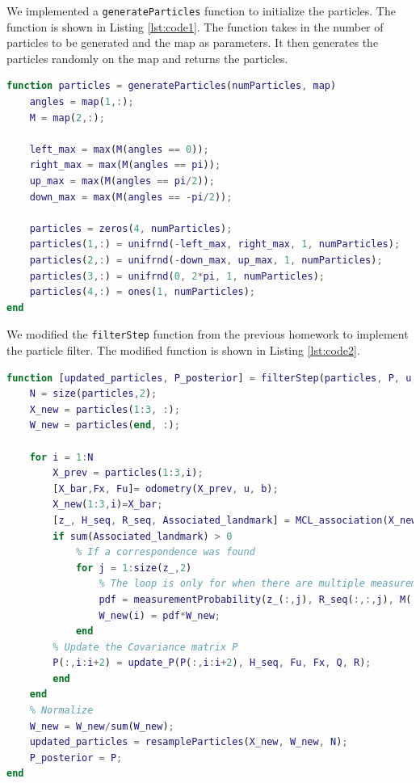 \documentclass[answers]{exam}
\begin{document}
\begin{questions}
\begin{parts}
\begin{solution}
            We implemented a \texttt{generateParticles} function to initialize the
            particles. The function is shown in Listing \ref{lst:code1}. The function takes
            in the number of particles to be generated and the map as parameters. It then
            generates the particles randomly on the map and returns the particles.

            \begin{lstlisting}[language=Matlab, caption=Generate Particles, label={lst:code1}]
function particles = generateParticles(numParticles, map)
    angles = map(1,:);
    M = map(2,:);

    left_max = max(M(angles == 0));
    right_max = max(M(angles == pi));
    up_max = max(M(angles == pi/2));
    down_max = max(M(angles == -pi/2));

    particles = zeros(4, numParticles);
    particles(1,:) = unifrnd(-left_max, right_max, 1, numParticles);
    particles(2,:) = unifrnd(-down_max, up_max, 1, numParticles);
    particles(3,:) = unifrnd(0, 2*pi, 1, numParticles);
    particles(4,:) = ones(1, numParticles);
end
            \end{lstlisting}

            We modified the \texttt{filterStep} function from the previous homework to
            implement the particle filter. The modified function is shown in Listing
            \ref{lst:code2}.
            \begin{lstlisting}[language=Matlab, caption=Filter Step, label={lst:code2}]
function [updated_particles, P_posterior] = filterStep(particles, P, u, Q, Z, R, M, g, b)
    N = size(particles,2);
    X_new = particles(1:3, :);
    W_new = particles(end, :);

    for i = 1:N
        X_prev = particles(1:3,i);
        [X_bar,Fx, Fu]= odometry(X_prev, u, b);
        X_new(1:3,i)=X_bar;
        [z_, H_seq, R_seq, Associated_landmark] = MCL_association(X_new, P(:,i:i+2), Z, R, M, g);
        if sum(Associated_landmark) > 0
            % If a correspondence was found
            for j = 1:size(z_,2)
                % The loop is only for when there are multiple measurements
                pdf = measurementProbability(z_(:,j), R_seq(:,:,j), M(:,j), X_bar);
                W_new(i) = pdf*W_new;
            end
        % Update the Covariance matrix P
        P(:,i:i+2) = update_P(P(:,i:i+2), H_seq, Fu, Fx, Q, R);
        end
    end
    % Normalize
    W_new = W_new/sum(W_new);
    updated_particles = resampleParticles(X_new, W_new, N);
    P_posterior = P;
end
            

\end{lstlisting}
\end{solution}
\end{parts}
\end{questions}
\end{document}

